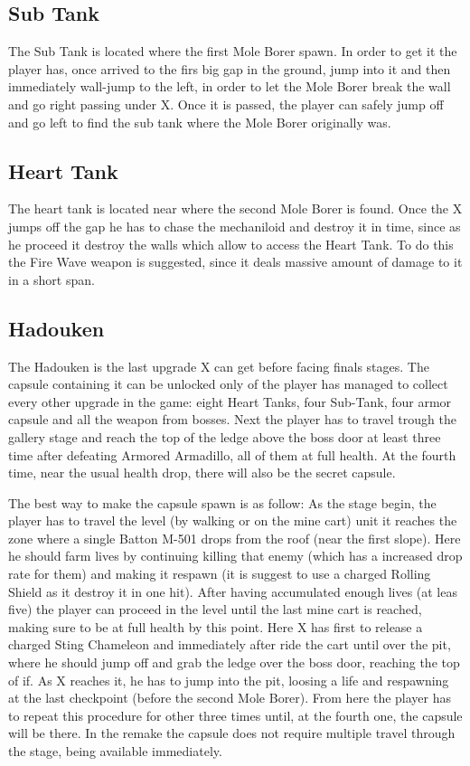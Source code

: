 \subsection{Sub Tank}
The Sub Tank is located where the first Mole Borer spawn. In order to get it the player has, once arrived to the firs big gap in the ground, jump into it and then immediately wall-jump to the left, in order to let the Mole Borer break the wall and go right passing under X. Once it is passed, the player can safely jump off and go left to find the sub tank where the Mole Borer originally was. 

\subsection{Heart Tank}
The heart tank is located near where the second Mole Borer is found. Once the X jumps off the gap he has to chase the mechaniloid and destroy it in time, since as he proceed it destroy the walls which allow to access the Heart Tank. To do this the Fire Wave weapon is suggested, since it deals massive amount of damage to it in a short span. 

\subsection{Hadouken}\label{Hadouken}
The Hadouken is the last upgrade X can get before facing finals stages. The capsule containing it can be unlocked only of the player has managed to collect every other upgrade in the game: eight Heart Tanks, four Sub-Tank, four armor capsule and all the weapon from bosses. Next the player has to travel trough the gallery stage and reach the top of the ledge above the boss door at least three time after defeating Armored Armadillo, all of them at full health. At the fourth time, near the usual health drop, there will also be the secret capsule.

The best way to make the capsule spawn is as follow: As the stage begin, the player has to travel the level (by walking or on the mine cart) unit it reaches the zone where a single Batton M-501 drops from the roof (near the first slope). Here he should farm lives by continuing killing that enemy (which has a increased drop rate for them)  and making it respawn (it is suggest to use a charged Rolling Shield as it destroy it in one hit). After having accumulated enough lives (at leas five) the player can proceed in the level until the last mine cart is reached, making sure to be at full health by this point. Here X has first to release a charged Sting Chameleon and immediately after ride the cart until over the pit, where he should jump off and grab the ledge over the boss door, reaching the top of if. As X reaches it, he has to jump into the pit, loosing a life and respawning at the last checkpoint (before the second Mole Borer). From here the player has to repeat this procedure for other three times until, at the  fourth one, the capsule will be there. In the remake the capsule does not require multiple travel through the stage, being available immediately.

